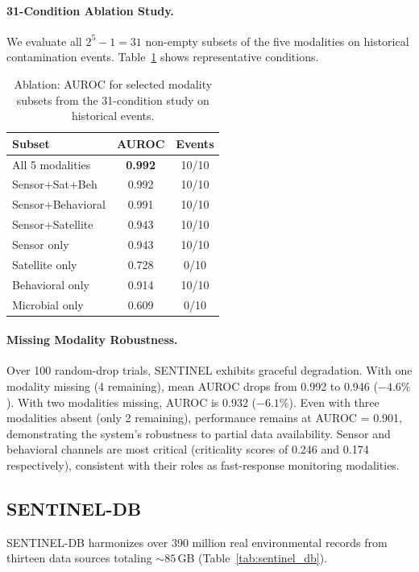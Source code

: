 \paragraph{31-Condition Ablation Study.}
We evaluate all $2^5 - 1 = 31$ non-empty subsets of the five modalities
on historical contamination events. Table~\ref{tab:ablation_summary}
shows representative conditions.

\begin{table}[t]
\centering
\caption{Ablation: AUROC for selected modality subsets
from the 31-condition study on historical events.}
\label{tab:ablation_summary}
\small
\begin{tabular}{lcc}
\toprule
\textbf{Subset} & \textbf{AUROC} & \textbf{Events} \\
\midrule
All 5 modalities & \textbf{0.992} & 10/10 \\
Sensor+Sat+Beh & 0.992 & 10/10 \\
Sensor+Behavioral & 0.991 & 10/10 \\
Sensor+Satellite & 0.943 & 10/10 \\
Sensor only & 0.943 & 10/10 \\
Satellite only & 0.728 & 0/10 \\
Behavioral only & 0.914 & 10/10 \\
Microbial only & 0.609 & 0/10 \\
\bottomrule
\end{tabular}
\end{table}

\paragraph{Missing Modality Robustness.}
Over 100 random-drop trials, SENTINEL exhibits graceful degradation.
With one modality missing (4 remaining), mean AUROC drops from 0.992 to
0.946 ($-4.6\%$). With two modalities missing, AUROC is 0.932 ($-6.1\%$).
Even with three modalities absent (only 2 remaining), performance remains
at AUROC = 0.901, demonstrating the system's robustness to partial data
availability. Sensor and behavioral channels are most critical (criticality
scores of 0.246 and 0.174 respectively), consistent with their roles as
fast-response monitoring modalities.

\subsection{SENTINEL-DB}

SENTINEL-DB harmonizes over 390 million real environmental records from
thirteen data sources totaling ${\sim}85$\,GB (Table~\ref{tab:sentinel_db}).

